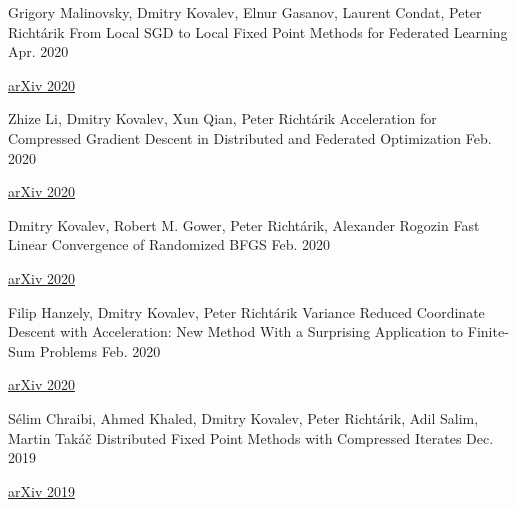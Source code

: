 
\begin{cventries}
	
	
\cventry
{Grigory Malinovsky, Dmitry Kovalev, Elnur Gasanov, Laurent Condat, Peter Richtárik} %
{From Local SGD to Local Fixed Point Methods for Federated Learning} %
{} %
{Apr. 2020} %
{ %
	\begin{cvitems}
		\item {\href{https://arxiv.org/pdf/2004.01442.pdf}{arXiv 2020}}		
	\end{cvitems}
}	
	
\cventry
{Zhize Li, Dmitry Kovalev, Xun Qian, Peter Richtárik} %
{Acceleration for Compressed Gradient Descent in Distributed and Federated Optimization} %
{} %
{Feb. 2020} %
{ %
	\begin{cvitems}
		\item {\href{https://arxiv.org/pdf/2002.11364.pdf}{arXiv 2020}}		
	\end{cvitems}
}	
	
\cventry
{Dmitry Kovalev, Robert M. Gower, Peter Richtárik, Alexander Rogozin} %
{Fast Linear Convergence of Randomized BFGS} %
{} %
{Feb. 2020} %
{ %
	\begin{cvitems}
		\item {\href{https://arxiv.org/pdf/2002.11337.pdf}{arXiv 2020}}		
	\end{cvitems}
}	
	
\cventry
{Filip Hanzely, Dmitry Kovalev, Peter Richtárik} %
{Variance Reduced Coordinate Descent with Acceleration: New Method With a Surprising Application to Finite-Sum Problems} %
{} %
{Feb. 2020} %
{ %
	\begin{cvitems}
		\item {\href{https://arxiv.org/pdf/2002.04670.pdf}{arXiv 2020}}		
	\end{cvitems}
}	
	
\cventry
{Sélim Chraibi, Ahmed Khaled, Dmitry Kovalev, Peter Richtárik, Adil Salim, Martin Takáč} %
{Distributed Fixed Point Methods with Compressed Iterates} %
{} %
{Dec. 2019} %
{ %
	\begin{cvitems}
		\item {\href{https://arxiv.org/pdf/1912.09925.pdf}{arXiv 2019}}		
	\end{cvitems}
}	
	

\end{cventries}
